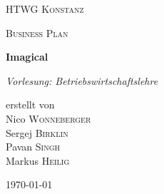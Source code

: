 \begin{titlepage}
	\centering
	{\scshape\LARGE HTWG Konstanz \par}
	\vspace{1cm}
	{\scshape\Large Business Plan\par}
	\vspace{1.5cm}
	{\huge\bfseries Imagical\par}
	\vspace{2cm}
	{\Large\itshape Vorlesung: Betriebswirtschaftslehre\par}
	\vfill
	erstellt von \\
	\vspace{0.5cm}
	Nico \textsc{Wonneberger} \\
	Sergej \textsc{Birklin} \\
	Pavan \textsc{Singh} \\
	Markus \textsc{Heilig}
	\vfill

	{\large \today\par}
\end{titlepage}